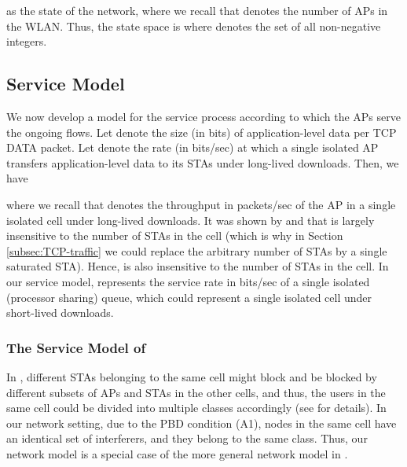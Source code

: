 \documentclass[10pt,a4paper,journal]{IEEEtran}
\theoremstyle{definition}
\theoremstyle{remark}
\theoremstyle{plain}
\begin{document}
as the state of the network, where we recall that  denotes the number of APs in the WLAN. Thus, the state space is  where  denotes the set of all non-negative integers. 






\subsection{Service Model}
\label{subsubsec:our-service-model-short-flows}

We now develop a model for the service process according to which the APs serve the ongoing flows. Let  denote the size (in bits) of application-level data per TCP DATA packet. Let  denote the rate (in bits/sec) at which a single isolated AP transfers application-level data to its STAs under long-lived downloads. Then, we have 
 
where we recall that  denotes the throughput in packets/sec of the AP in a single isolated cell under long-lived downloads. It was shown by \cite{wanet.harsha07WiNet} and \cite{wanet.bruno08TCPeqvSatModel} that  is largely insensitive to the number of STAs in the cell (which is why in Section \ref{subsec:TCP-traffic} we could replace the arbitrary number of STAs by a single saturated STA). Hence,  is also insensitive to the number of STAs in the cell. In our service model,  represents the service rate in bits/sec of a single isolated (processor sharing) queue, which could represent a single isolated cell under short-lived downloads. 



\subsubsection{The Service Model of \cite{wanet.bonald08multicellprocsharing}}
\label{subsubsec:inaccuracy-Bonald-service-model}



In \cite{wanet.bonald08multicellprocsharing}, different STAs belonging to the same cell might block and be blocked by different subsets of APs and STAs in the other cells, and thus, the users in the same cell could be divided into multiple classes accordingly (see \cite{wanet.bonald08multicellprocsharing} for details). In our network setting, due to the PBD condition (A1), nodes in the same cell have an identical set of interferers, and they belong to the same class. Thus, our network model is a special case of the more general network model in \cite{wanet.bonald08multicellprocsharing}. 
\end{document}
